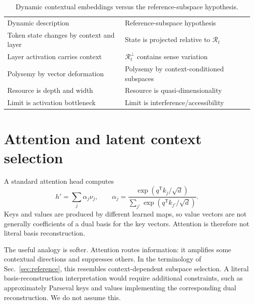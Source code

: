 \documentclass[
  aps,
  reprint,
  superscriptaddress,
  floatfix,
  nofootinbib,
  longbibliography
]{revtex4-2}
\newcommand{\T}{^{\mathsf{T}}}
\begin{document}
\begin{table}[ht]
\caption{Dynamic contextual embeddings versus the reference-subspace
hypothesis.}
\label{tab:two-views}
\centering
\begin{minipage}{0.72\textwidth}
\begin{ruledtabular}
\begin{tabular}{@{}ll@{}}
Dynamic description & Reference-subspace hypothesis \\
\colrule
Token state changes by context and layer & State is projected relative to $\mathcal R_t$ \\
Layer activation carries context & $\mathcal R_t^\perp$ contains sense variation \\
Polysemy by vector deformation & Polysemy by context-conditioned subspaces \\
Resource is depth and width & Resource is quasi-dimensionality \\
Limit is activation bottleneck & Limit is interference/accessibility \\
\end{tabular}
\end{ruledtabular}
\end{minipage}
\end{table}

\section{Attention and latent context selection}
\label{sec:attention}

A standard attention head computes
%
\begin{equation}
\label{eq:attention}
h'=\sum_j\alpha_j\nu_j,
\qquad
\alpha_j=
\frac{\exp(q\T k_j/\sqrt d)}
{\sum_{j'}\exp(q\T k_{j'}/\sqrt d)} .
\end{equation}
%
Keys and values are produced by different learned maps, so value vectors
are not generally coefficients of a dual basis for the key vectors.
Attention is therefore not literal basis reconstruction.

The useful analogy is softer. Attention routes information: it amplifies
some contextual directions and suppresses others. In the terminology of
Sec.~\ref{sec:reference}, this resembles context-dependent subspace
selection. A literal basis-reconstruction interpretation would require
additional constraints, such as approximately Parseval keys and values
implementing the corresponding dual reconstruction. We do not assume this.
\end{document}
